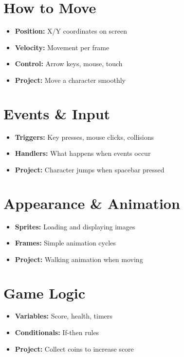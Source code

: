\documentclass{article}
\begin{document}
\section{How to Move}
\begin{itemize}[nosep, leftmargin=*]
\item \textbf{Position:} X/Y coordinates on screen
\item \textbf{Velocity:} Movement per frame
\item \textbf{Control:} Arrow keys, mouse, touch
\item \textbf{Project:} Move a character smoothly
\end{itemize}

\section{Events \& Input}
\begin{itemize}[nosep, leftmargin=*]
\item \textbf{Triggers:} Key presses, mouse clicks, collisions
\item \textbf{Handlers:} What happens when events occur
\item \textbf{Project:} Character jumps when spacebar pressed
\end{itemize}

\section{Appearance \& Animation}
\begin{itemize}[nosep, leftmargin=*]
\item \textbf{Sprites:} Loading and displaying images
\item \textbf{Frames:} Simple animation cycles
\item \textbf{Project:} Walking animation when moving
\end{itemize}

\section{Game Logic}
\begin{itemize}[nosep, leftmargin=*]
\item \textbf{Variables:} Score, health, timers
\item \textbf{Conditionals:} If-then rules
\item \textbf{Project:} Collect coins to increase score
\end{itemize}
\end{document}
